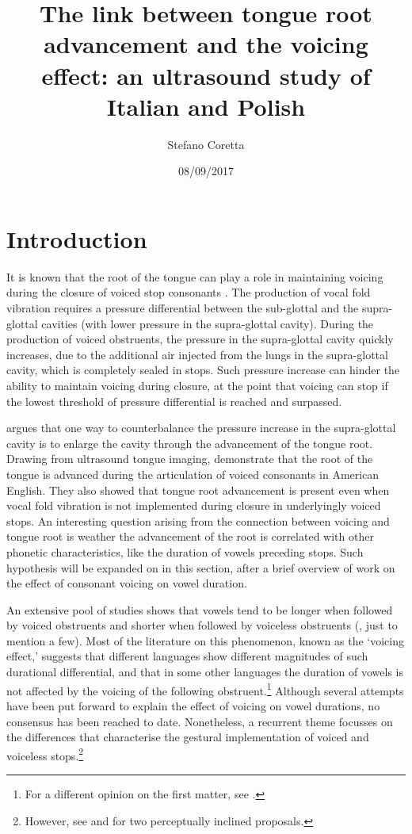 \documentclass[authoryear, twocolumn]{elsarticle}
\author[mcr]{Stefano Coretta\corref{cor1}}
\title{The link between tongue root advancement and the voicing effect: an
ultrasound study of Italian and Polish}
\date{08/09/2017}
\begin{document}
\maketitle

\section{Introduction}\label{introduction}

It is known that the root of the tongue can play a role in maintaining
voicing during the closure of voiced stop consonants
\citep{halle1967,kent1969,perkell1969,westbury1983}. The production of
vocal fold vibration requires a pressure differential between the
sub-glottal and the supra-glottal cavities (with lower pressure in the
supra-glottal cavity). During the production of voiced obstruents, the
pressure in the supra-glottal cavity quickly increases, due to the
additional air injected from the lungs in the supra-glottal cavity,
which is completely sealed in stops. Such pressure increase can hinder
the ability to maintain voicing during closure, at the point that
voicing can stop if the lowest threshold of pressure differential is
reached and surpassed.

\citet{westbury1983} argues that one way to counterbalance the pressure
increase in the supra-glottal cavity is to enlarge the cavity through
the advancement of the tongue root. Drawing from ultrasound tongue
imaging, \citet{ahn2016} demonstrate that the root of the tongue is
advanced during the articulation of voiced consonants in American
English. They also showed that tongue root advancement is present even
when vocal fold vibration is not implemented during closure in
underlyingly voiced stops. An interesting question arising from the
connection between voicing and tongue root is weather the advancement of
the root is correlated with other phonetic characteristics, like the
duration of vowels preceding stops. Such hypothesis will be expanded on
in this section, after a brief overview of work on the effect of
consonant voicing on vowel duration.

An extensive pool of studies shows that vowels tend to be longer when
followed by voiced obstruents and shorter when followed by voiceless
obstruents (\citealt{house1953,chen1970,klatt1973,lisker1973}, just to
mention a few). Most of the literature on this phenomenon, known as the
`voicing effect,' suggests that different languages show different
magnitudes of such durational differential, and that in some other
languages the duration of vowels is not affected by the voicing of the
following
obstruent.\footnote{For a different opinion on the first matter, see \citet{laeufer1992}.}
Although several attempts have been put forward to explain the effect of
voicing on vowel durations, no consensus has been reached to date.
Nonetheless, a recurrent theme focusses on the differences that
characterise the gestural implementation of voiced and voiceless
stops.\footnote{However, see \citet{javkin1976} and \citet{kluender1988} for two perceptually inclined proposals.}
\end{document}
